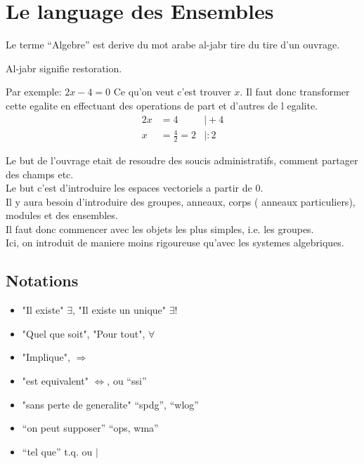 \documentclass[../main.tex]{subfiles}
\begin{document}
\chapter{Le language des Ensembles}

Le terme ``Algebre'' est derive du mot arabe al-jabr tire du tire d'un ouvrage.

Al-jabr signifie restoration.

Par exemple:
$2x -4 = 0$
Ce qu'on veut c'est trouver $x$.
Il faut donc transformer cette egalite en effectuant des operations de part et d'autres de l egalite.
\begin{align*}
	2x &= 4 &\vert +4\\
	x &= \frac{4}{2} = 2  &\vert :2
\end{align*}



Le but de l'ouvrage etait de resoudre des soucis administratifs, comment partager des champs etc.\\

Le but c'est d'introduire les espaces vectoriels a partir de 0.\\

Il y aura besoin d'introduire des groupes, anneaux, corps ( anneaux particuliers), modules et des ensembles.\\

Il faut donc commencer avec les objets les plus simples, i.e. les groupes.\\
Ici, on introduit de maniere moins rigoureuse qu'avec les systemes algebriques.

\section{Notations}

\begin{itemize}
	\item "Il existe" $\exists$, "Il existe un unique"  $\exists !$\\
	\item "Quel que soit", "Pour tout",  $\forall$\\
	\item "Implique",  $\Rightarrow$ \\
	\item "est equivalent" $\iff$, ou ``ssi''\\
	\item "sans perte de generalite" ``spdg'', ``wlog''\\
	\item ``on peut supposer'' ``ops, wma''\\
	\item ``tel que'' t.q. ou $\vert$
\end{itemize}
\end{document}
